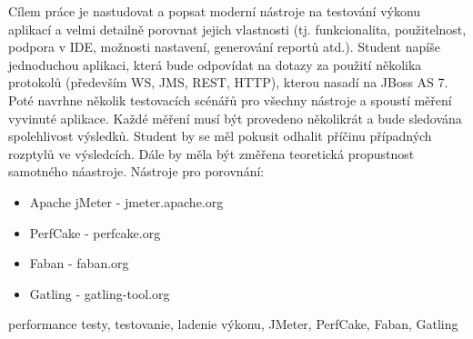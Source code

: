 \documentclass[12pt,oneside,final]{fithesis-utf8}
\begin{document}
\FrontMatter
\ThesisTitlePage

\begin{ThesisDeclaration}
\DeclarationText
\AdvisorName
\end{ThesisDeclaration}

\begin{ThesisThanks}


\end{ThesisThanks}

\begin{ThesisAbstract}
 Cílem práce je nastudovat a popsat moderní nástroje na testování výkonu aplikací a velmi detailně porovnat jejich vlastnosti (tj. funkcionalita, použitelnost, podpora v IDE, možnosti nastavení, generování reportů atd.). Student napíše jednoduchou aplikaci, která bude odpovídat na dotazy za použití několika protokolů (především WS, JMS, REST, HTTP), kterou nasadí na JBoss AS 7. Poté navrhne několik testovacích scénářů pro všechny nástroje a spoustí měření vyvinuté aplikace. Každé měření musí být provedeno několikrát a bude sledována spolehlivost výsledků. Student by se měl pokusit odhalit příčinu případných rozptylů ve výsledcích. Dále by měla být změřena teoretická propustnost samotného náastroje.
\newline \newline
Nástroje pro porovnání: 
\begin{itemize}

    \item Apache jMeter - jmeter.apache.org
    \item PerfCake - perfcake.org
    \item Faban - faban.org
    \item Gatling - gatling-tool.org

\end{itemize}
\end{ThesisAbstract}

\begin{ThesisKeyWords}
performance testy, testovanie, ladenie výkonu, JMeter, PerfCake, Faban, Gatling
\end{ThesisKeyWords}

\tableofcontents
\listoffigures
\MainMatter
\end{document}

